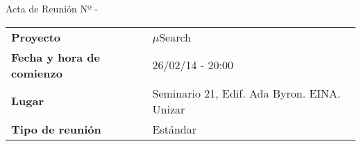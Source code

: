\begin{center}	
\Large{Acta de Reunión Nº \numeroDeReunion\hspace{0.25em}-\hspace{0.25em}\tituloReunion}
\end{center}
\vspace{1.5em}

\begin{longtable}{ | L{\tabcolsep} |
				     L{\tabcolsep} | }
\hline %
  \\
\hline %
{\bf Proyecto} & $\mu$Search \\ 
\hline %
{\bf Fecha y hora de comienzo} & 26/02/14 - 20:00 \\
\hline %
{\bf Lugar} & Seminario 21, Edif. Ada Byron. EINA. Unizar \\
\hline %
{\bf Tipo de reunión} & Estándar \\
\hline %
\end{longtable}


